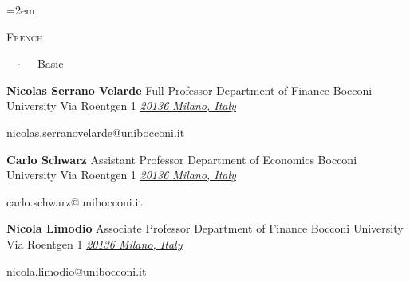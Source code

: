 \documentclass{scrartcl}
\newcommand{\MarginText}[1]{\marginpar{\raggedleft\itshape\small#1}} %
\newcommand{\Description}[1]{\hangindent=2em\hangafter=0\noindent\raggedright\footnotesize{#1}\par\normalsize\vspace{1em}} %
\newcommand{\cvreference}[6]{%
    \textbf{#1}\newline%
    #2\newline%
    #3\newline%
    #4\newline%
    #5\newline%
    \textit{\href{mailto:#6}{#6}\newline%
    }%
}
\begin{document}
\begin{cv}{}
\Description{\parbox{\langbox}{\textsc{French}}\ \ $\cdotp$\ \ \ Basic }

\vspace{-1em} %
\fi 








\vspace{1em}

\begin{minipage}[t]{0.45\textwidth}
    \footnotesize %
    \cvreference{Nicolas Serrano Velarde}
        {Full Professor}
        {Department of Finance}
        {Bocconi University}
        {Via Roentgen 1}
        {20136 Milano, Italy}
        {nicolas.serranovelarde@unibocconi.it}\\[1em]
\end{minipage}\hfill %
\begin{minipage}[t]{0.45\textwidth}
    \footnotesize %
    \cvreference{Carlo Schwarz}
        {Assistant Professor}
        {Department of Economics}
        {Bocconi University}
        {Via Roentgen 1}
        {20136 Milano, Italy}
        {carlo.schwarz@unibocconi.it}
\end{minipage}

{\footnotesize %
\cvreference{Nicola Limodio}
        {Associate Professor}
        {Department of Finance}
        {Bocconi University}
        {Via Roentgen 1}
        {20136 Milano, Italy}
        {nicola.limodio@unibocconi.it}\\[1em]
} %












\end{cv}
\end{document}
